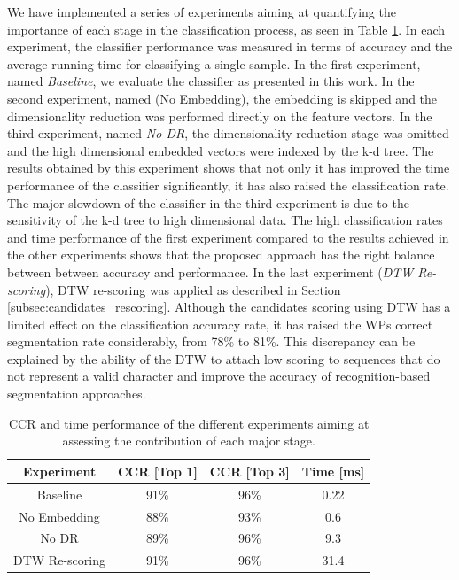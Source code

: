 \documentclass[10pt, conference, compsocconf]{IEEEtran}
\begin{document}
We have implemented a series of experiments aiming at quantifying the importance of each stage in the classification process, as seen in Table \ref{table:stages_contribution}.
In each experiment, the classifier performance was measured in terms of accuracy and the average running time for classifying a single sample.
In the first experiment, named \emph{Baseline}, we evaluate the classifier as presented in this work.
In the second experiment, named (No Embedding), the embedding is skipped and the dimensionality reduction was performed directly on the feature vectors. 
In the third experiment, named \emph{No DR}, the dimensionality reduction stage was omitted and the  high dimensional embedded vectors were indexed by the k-d tree.
The results obtained by this experiment shows that not only it has improved the time performance of the classifier significantly, it has also raised the classification rate.
The major slowdown of the classifier in the third experiment is due to the sensitivity of the k-d tree to high dimensional data.
The high classification rates and time performance of the first experiment compared to the results achieved in the other experiments shows that the proposed approach has the right balance between between accuracy and performance.
In the last experiment (\emph{DTW Re-scoring}), DTW re-scoring was applied as described in Section \ref{subsec:candidates_rescoring}. 
Although the candidates scoring using DTW has a limited effect on the classification accuracy rate, it has raised the WPs correct segmentation rate considerably, from 78\% to 81\%.
This discrepancy can be explained by the ability of the DTW to attach low scoring to sequences that do not represent a valid character and improve the accuracy of recognition-based segmentation approaches.

\begin{table}
\centering
\begin{tabular}{ | c | c | c | c |}
  \hline
  \textbf{Experiment}  & \textbf{CCR [Top 1]}  & \textbf{CCR [Top 3]} & \textbf{Time [ms]}\\
  \hline
  Baseline      & 91\% & 96\% & 0.22 \\
  \hline
  No Embedding  & 88\% & 93\% & 0.6  \\
  \hline 
  No DR         & 89\% & 96\% & 9.3  \\ 
  \hline
  DTW Re-scoring& 91\% & 96\% & 31.4 \\ 
  \hline
\end{tabular}
\caption{CCR and time performance of the different experiments aiming at assessing the contribution of each major stage.}
\label{table:stages_contribution} 
\end{table}
\end{document}
